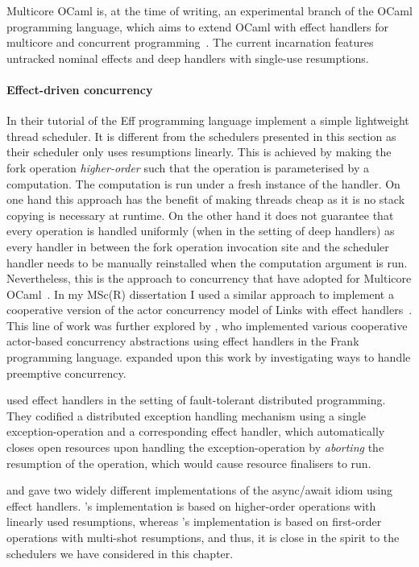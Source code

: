 \documentclass[12pt,phd,lfcs,twoside,openright,logo,leftchapter,normalheadings]{infthesis}
\theoremstyle{plain}
\theoremstyle{definition}
\begin{document}
Multicore OCaml is, at the time of writing, an experimental branch of
the OCaml programming language, which aims to extend OCaml with effect
handlers for multicore and concurrent
programming~\cite{DolanWM14,DolanWSYM15}. The current incarnation
features untracked nominal effects and deep handlers with single-use
resumptions.


\paragraph{Effect-driven concurrency}
In their tutorial of the Eff programming language \citet{BauerP15}
implement a simple lightweight thread scheduler. It is different from
the schedulers presented in this section as their scheduler only uses
resumptions linearly. This is achieved by making the fork operation
\emph{higher-order} such that the operation is parameterised by a
computation. The computation is run under a fresh instance of the
handler. On one hand this approach has the benefit of making threads
cheap as it is no stack copying is necessary at runtime. On the other
hand it does not guarantee that every operation is handled uniformly
(when in the setting of deep handlers) as every handler in between the
fork operation invocation site and the scheduler handler needs to be
manually reinstalled when the computation argument is
run. Nevertheless, this is the approach to concurrency that
\citet{DolanWSYM15} have adopted for Multicore
OCaml~\cite{DolanWSYM15}.
%
In my MSc(R) dissertation I used a similar approach to implement a
cooperative version of the actor concurrency model of Links with
effect handlers~\cite{Hillerstrom16}.
%
This line of work was further explored by \citet{Convent17}, who
implemented various cooperative actor-based concurrency abstractions
using effect handlers in the Frank programming
language. \citet{Poulson20} expanded upon this work by investigating
ways to handle preemptive concurrency.

\citet{FowlerLMD19} used effect handlers in the setting of
fault-tolerant distributed programming. They codified a distributed
exception handling mechanism using a single exception-operation and a
corresponding effect handler, which automatically closes open
resources upon handling the exception-operation by \emph{aborting} the
resumption of the operation, which would cause resource finalisers to
run.

\citet{DolanEHMSW17} and \citet{Leijen17a} gave two widely different
implementations of the async/await idiom using effect
handlers. \citeauthor{DolanEHMSW17}'s implementation is based on
higher-order operations with linearly used resumptions, whereas
\citeauthor{Leijen17a}'s implementation is based on first-order
operations with multi-shot resumptions, and thus, it is close in the
spirit to the schedulers we have considered in this chapter.
\end{document}

